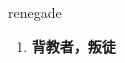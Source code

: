 
\begin{frame}
{\huge renegade}
\begin{center}
\begin{enumerate}\Large
  \item \textbf{背教者，叛徒}
\end{enumerate}
\end{center}
\end{frame}
